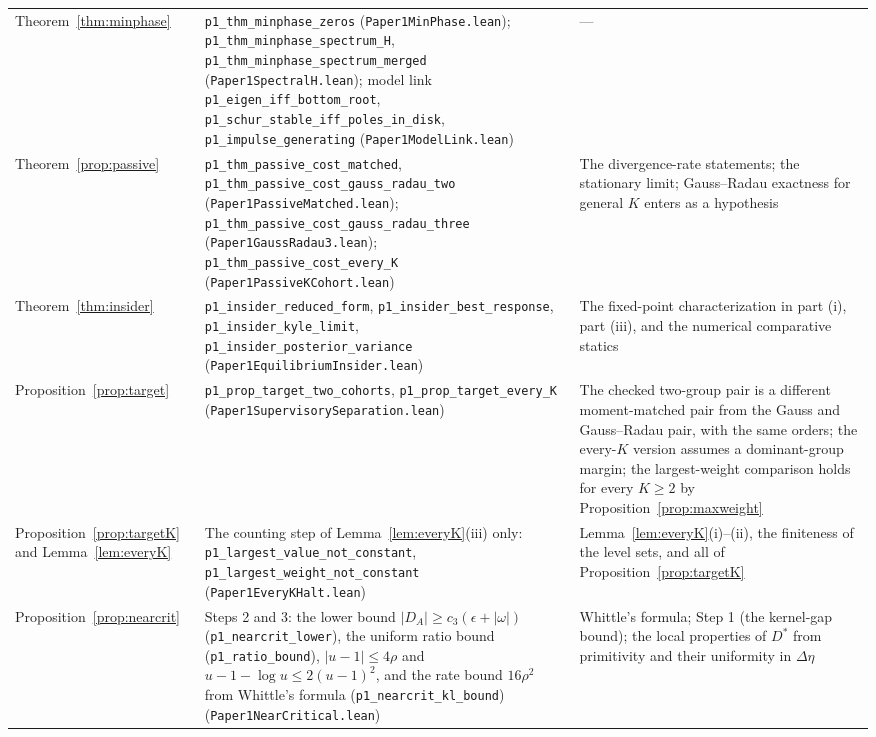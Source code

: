 \begin{longtable}{>{\raggedright\arraybackslash}p{}>{\raggedright\arraybackslash}p{}>{\raggedright\arraybackslash}p{}}
Theorem~\ref{thm:minphase} & \texttt{p1\_thm\_minphase\_zeros} (\nolinkurl{Paper1MinPhase.lean}); \texttt{p1\_thm\_minphase\_spectrum\_H}, \texttt{p1\_thm\_minphase\_spectrum\_merged} (\nolinkurl{Paper1SpectralH.lean}); model link \texttt{p1\_eigen\_iff\_bottom\_root}, \texttt{p1\_schur\_stable\_iff\_poles\_in\_disk}, \texttt{p1\_impulse\_generating} (\nolinkurl{Paper1ModelLink.lean}) & ---\\
Theorem~\ref{prop:passive} & \texttt{p1\_thm\_passive\_cost\_matched}, \texttt{p1\_thm\_passive\_cost\_gauss\_radau\_two} (\nolinkurl{Paper1PassiveMatched.lean}); \nolinkurl{p1_thm_passive_cost_gauss_radau_three} (\nolinkurl{Paper1GaussRadau3.lean}); \texttt{p1\_thm\_passive\_cost\_every\_K} (\nolinkurl{Paper1PassiveKCohort.lean}) & The divergence-rate statements; the stationary limit; Gauss--Radau exactness for general $K$ enters as a hypothesis\\
Theorem~\ref{thm:insider} & \texttt{p1\_insider\_reduced\_form}, \texttt{p1\_insider\_best\_response}, \texttt{p1\_insider\_kyle\_limit}, \texttt{p1\_insider\_posterior\_variance} (\nolinkurl{Paper1EquilibriumInsider.lean}) & The fixed-point characterization in part (i), part (iii), and the numerical comparative statics\\
Proposition~\ref{prop:target} & \texttt{p1\_prop\_target\_two\_cohorts}, \texttt{p1\_prop\_target\_every\_K} (\nolinkurl{Paper1SupervisorySeparation.lean}) & The checked two-group pair is a different moment-matched pair from the Gauss and Gauss--Radau pair, with the same orders; the every-$K$ version assumes a dominant-group margin; the largest-weight comparison holds for every $K\ge 2$ by Proposition~\ref{prop:maxweight}\\
Proposition~\ref{prop:targetK} and Lemma~\ref{lem:everyK} & The counting step of Lemma~\ref{lem:everyK}(iii) only: \texttt{p1\_largest\_value\_not\_constant}, \texttt{p1\_largest\_weight\_not\_constant} (\nolinkurl{Paper1EveryKHalt.lean}) & Lemma~\ref{lem:everyK}(i)--(ii), the finiteness of the level sets, and all of Proposition~\ref{prop:targetK}\\
Proposition~\ref{prop:nearcrit} & Steps 2 and 3: the lower bound $|D_A|\ge c_3(\epsilon+|\omega|)$ (\texttt{p1\_nearcrit\_lower}), the uniform ratio bound (\texttt{p1\_ratio\_bound}), $|u-1|\le4\rho$ and $u-1-\log u\le2(u-1)^2$, and the rate bound $16\rho^2$ from Whittle's formula (\texttt{p1\_nearcrit\_kl\_bound}) (\nolinkurl{Paper1NearCritical.lean}) & Whittle's formula; Step 1 (the kernel-gap bound); the local properties of $D^*$ from primitivity and their uniformity in $\Delta\eta$\\

\end{longtable}
